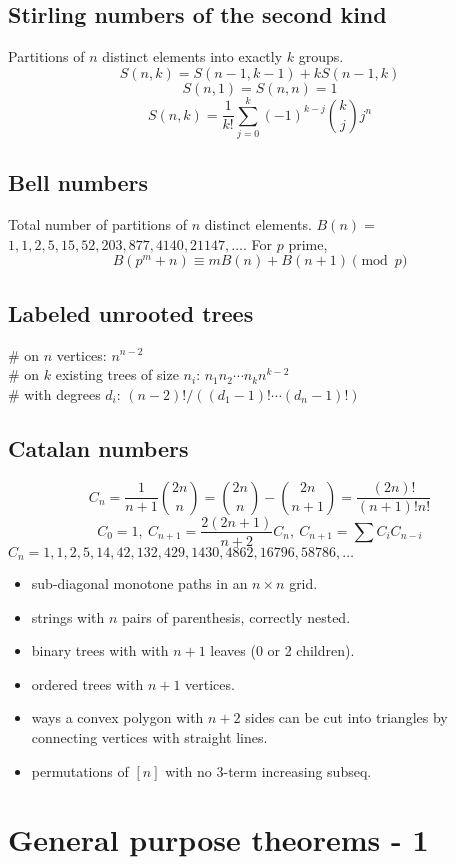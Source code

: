 	\subsection{Stirling numbers of the second kind}
		Partitions of $n$ distinct elements into exactly $k$ groups.
		$$S(n,k) = S(n-1,k-1) + k S(n-1,k)$$
		$$S(n,1) = S(n,n) = 1$$
		$$S(n,k) = \frac{1}{k!}\sum_{j=0}^k (-1)^{k-j}\binom{k}{j}j^n$$

	\subsection{Bell numbers}
		Total number of partitions of $n$ distinct elements. $B(n) =$
		$1, 1, 2, 5, 15, 52, 203, 877, 4140, 21147, \dots$. For $p$ prime,
		\[ B(p^m+n)\equiv mB(n)+B(n+1) \pmod{p} \]

	\subsection{Labeled unrooted trees}
		\# on $n$ vertices: $n^{n-2}$ \\
		\# on $k$ existing trees of size $n_i$: $n_1n_2\cdots n_k n^{k-2}$ \\
		\# with degrees $d_i$: $(n-2)! / ((d_1-1)! \cdots (d_n-1)!)$

	\subsection{Catalan numbers}
		\[ C_n=\frac{1}{n+1}\binom{2n}{n}= \binom{2n}{n}-\binom{2n}{n+1} = \frac{(2n)!}{(n+1)!n!} \]
		\[ C_0=1,\ C_{n+1} = \frac{2(2n+1)}{n+2}C_n,\ C_{n+1}=\sum C_iC_{n-i} \]
		${C_n = 1, 1, 2, 5, 14, 42, 132, 429, 1430, 4862, 16796, 58786, \dots}$
		\begin{itemize}[noitemsep]
			\item sub-diagonal monotone paths in an $n\times n$ grid.
			\item strings with $n$ pairs of parenthesis, correctly nested.
			\item binary trees with with $n+1$ leaves (0 or 2 children).
			\item ordered trees with $n+1$ vertices.
			\item ways a convex polygon with $n+2$ sides can be cut into triangles by connecting vertices with straight lines.
			\item permutations of $[n]$ with no 3-term increasing subseq.
		\end{itemize}
 \section{General purpose theorems - 1}

